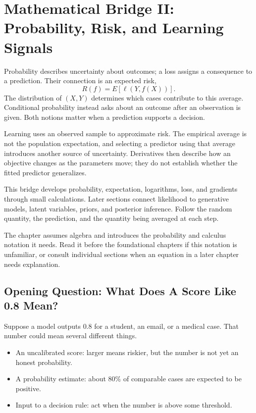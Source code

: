 \chapter*{Mathematical Bridge II: Probability, Risk, and Learning Signals}

Probability describes uncertainty about outcomes; a loss assigns a consequence to a prediction. Their connection is an expected risk,
\[
R(f)=E[\ell(Y,f(X))].
\]
The distribution of $(X,Y)$ determines which cases contribute to this average. Conditional probability instead asks about an outcome after an observation is given. Both notions matter when a prediction supports a decision.

Learning uses an observed sample to approximate risk. The empirical average is not the population expectation, and selecting a predictor using that average introduces another source of uncertainty. Derivatives then describe how an objective changes as the parameters move; they do not establish whether the fitted predictor generalizes.

This bridge develops probability, expectation, logarithms, loss, and gradients through small calculations. Later sections connect likelihood to generative models, latent variables, priors, and posterior inference. Follow the random quantity, the prediction, and the quantity being averaged at each step.

\begin{prereqbridge}
The chapter assumes algebra and introduces the probability and calculus notation it needs. Read it before the foundational chapters if this notation is unfamiliar, or consult individual sections when an equation in a later chapter needs explanation.
\end{prereqbridge}

\section*{Opening Question: What Does A Score Like 0.8 Mean?}

Suppose a model outputs \(0.8\) for a student, an email, or a medical case. That number could mean several different things.

\begin{itemize}[leftmargin=*]
\item An uncalibrated score: larger means riskier, but the number is not yet an honest probability.
\item A probability estimate: about \(80\%\) of comparable cases are expected to be positive.
\item Input to a decision rule: act when the number is above some threshold.
\end{itemize}

